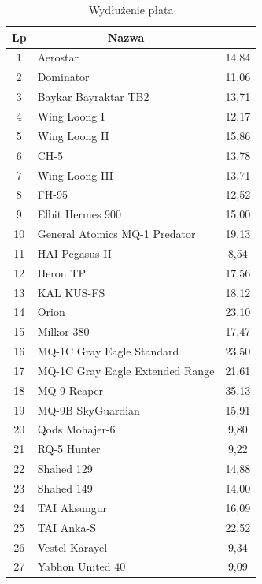 \documentclass[
    bindingoffset=5mm,
    footnoteindent=3mm,
    hyphenation=true    
]{src/wut-thesis}
\begin{document}
\begin{longtable}{| c | m{0,5\linewidth} | c |}
    \caption{Wydłużenie płata}
    \label{table:aspect_ratio} \\
    \hline
    \textbf{Lp} & \multicolumn{1}{c|}{\textbf{Nazwa}} & \textbf{\begin{tabular}[c]{@{}c@{}}Wydłużenie płata {[}-{]}\end{tabular}} \\ \hline \hline
    \endfirsthead
    
    \hline
    \endfoot
    
    1 & Aerostar & 14,84 \\ \hline
    2 & Dominator & 11,06 \\ \hline
    3 & Baykar Bayraktar TB2 & 13,71 \\ \hline
    4 & Wing Loong I & 12,17 \\ \hline
    5 & Wing Loong II & 15,86 \\ \hline
    6 & CH-5 & 13,78 \\ \hline
    7 & Wing Loong III & 13,71 \\ \hline
    8 & FH-95 & 12,52 \\ \hline
    9 & Elbit Hermes 900 & 15,00 \\ \hline
    10 & General Atomics MQ-1 Predator & 19,13 \\ \hline
    11 & HAI Pegasus II & 8,54 \\ \hline
    12 & Heron TP & 17,56 \\ \hline
    13 & KAL KUS-FS & 18,12 \\ \hline
    14 & Orion & 23,10 \\ \hline
    15 & Milkor 380 & 17,47 \\ \hline
    16 & MQ-1C Gray Eagle Standard & 23,50 \\ \hline
    17 & MQ-1C Gray Eagle Extended Range & 21,61 \\ \hline
    18 & MQ-9 Reaper & 35,13 \\ \hline
    19 & MQ-9B SkyGuardian & 15,91 \\ \hline
    20 & Qods Mohajer-6 & 9,80 \\ \hline
    21 & RQ-5 Hunter & 9,22 \\ \hline
    22 & Shahed 129 & 14,88 \\ \hline
    23 & Shahed 149 & 14,00 \\ \hline
    24 & TAI Aksungur & 16,09 \\ \hline
    25 & TAI Anka-S & 22,52 \\ \hline
    26 & Vestel Karayel & 9,34 \\ \hline
    27 & Yabhon United 40 & 9,09 \\ \hline
\end{longtable}
\end{document}
